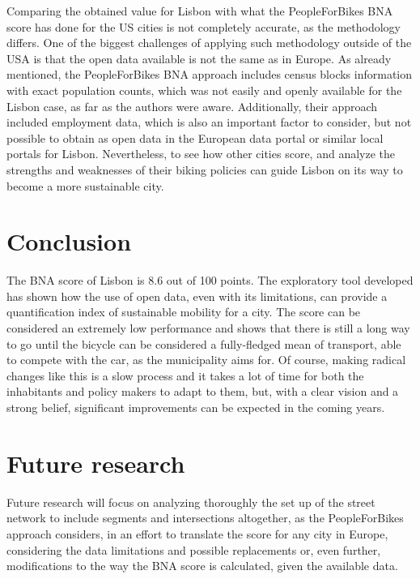 \documentclass[information,article,submit,moreauthors,pdftex,10pt,a4paper]{mdpi}
\theoremstyle{mdpi}
\newcounter{ex}
\newcounter{re}
\theoremstyle{mdpidefinition}
\begin{document}
Comparing the obtained value for Lisbon with what the PeopleForBikes BNA score has done for the US cities is not completely accurate, as the methodology differs. One of the biggest challenges of applying such methodology outside of the USA is that the open data available is not the same as in Europe. As already mentioned, the PeopleForBikes BNA approach includes census blocks information with exact population counts, which was not easily and openly available for the Lisbon case, as far as the authors were aware. Additionally, their approach included employment data, which is also an important factor to consider, but not possible to obtain as open data in the European data portal or similar local portals for Lisbon. Nevertheless, to see how other cities score, and analyze the strengths and weaknesses of their biking policies can guide Lisbon on its way to become a more sustainable city. 

\section{Conclusion} \label{conclusion}

The BNA score of Lisbon is 8.6 out of 100 points. The exploratory tool developed has shown how the use of open data, even with its limitations, can provide a quantification index of sustainable mobility for a city. The score can be considered an extremely low performance and shows that there is still a long way to go until the bicycle can be considered a fully-fledged mean of transport, able to compete with the car, as the municipality aims for. Of course, making radical changes like this is a slow process and it takes a lot of time for both the inhabitants and policy makers to adapt to them, but, with a clear vision and a strong belief, significant improvements can be expected in the coming years.

\section{Future research} \label{future}

Future research will focus on analyzing thoroughly the set up of the street network to include segments and intersections altogether, as the PeopleForBikes approach considers, in an effort to translate the score for any city in Europe, considering the data limitations and possible replacements or, even further, modifications to the way the BNA score is calculated, given the available data. 
\end{document}
